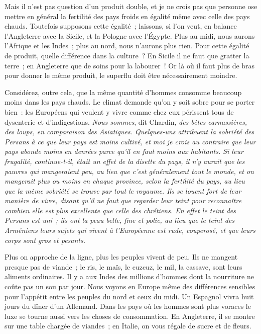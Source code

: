 \documentclass[french,twoside]{book} %
\begin{document}
Mais il n’est pas question d’un produit double, et je ne crois pas que personne ose mettre en général la fertilité des pays froids en égalité même avec celle des pays chauds. Toutefois supposons cette égalité ; laissons, si l’on veut, en balance l’Angleterre avec la Sicile, et la Pologne avec l’Égypte. Plus au midi, nous aurons l’Afrique et les Indes ; plus au nord, nous n’aurons plus rien. Pour cette égalité de produit, quelle différence dans la culture ? En Sicile il ne faut que gratter la terre ; en Angleterre que de soins pour la labourer ! Or là où il faut plus de bras pour donner le même produit, le superflu doit être nécessairement moindre.\par
Considérez, outre cela, que la même quantité d’hommes consomme beaucoup moins dans les pays chauds. Le climat demande qu’on y soit sobre pour se porter bien : les Européens qui veulent y vivre comme chez eux périssent tous de dysenterie et d’indigestions. {\itshape Nous sommes}, dit Chardin, {\itshape des bêtes carnassières, des loups, en comparaison des Asiatiques. Quelques-uns attribuent la sobriété des Persans à ce que leur pays est moins cultivé, et moi je crois au contraire que leur pays abonde moins en denrées parce qu’il en faut moins aux habitants. Si leur frugalité, continue-t-il, était un effet de la disette du pays, il n’y aurait que les pauvres qui mangeraient peu, au lieu que c’est généralement tout le monde, et on mangerait plus ou moins en chaque province, selon la fertilité du pays, au lieu que la même sobriété se trouve par tout le royaume. Ils se louent fort de leur manière de vivre, disant qu’il ne faut que regarder leur teint pour reconnaître combien elle est plus excellente que celle des chrétiens. En effet le teint des Persans est uni ; ils ont la peau belle, fine et polie, au lieu que le teint des Arméniens leurs sujets qui vivent à l’Européenne est rude, couperosé, et que leurs corps sont gros et pesants.}\par
Plus on approche de la ligne, plus les peuples vivent de peu. Ils ne mangent presque pas de viande ; le ris, le maïs, le cuzcuz, le mil, la cassave, sont leurs aliments ordinaires. Il y a aux Indes des millions d’hommes dont la nourriture ne coûte pas un sou par jour. Nous voyons en Europe même des différences sensibles pour l’appétit entre les peuples du nord et ceux du midi. Un Espagnol vivra huit jours du dîner d’un Allemand. Dans les pays où les hommes sont plus voraces le luxe se tourne aussi vers les choses de consommation. En Angleterre, il se montre sur une table chargée de viandes ; en Italie, on vous régale de sucre et de fleurs.\par
\end{document}
